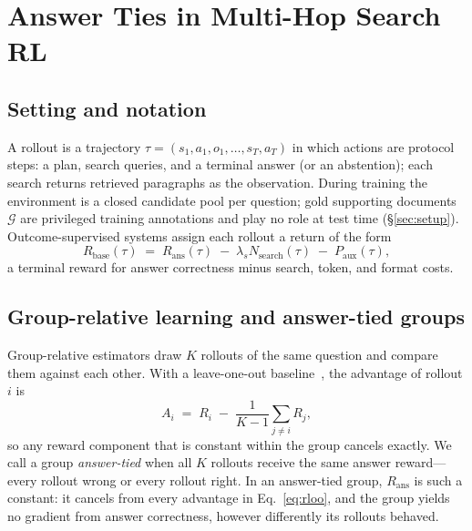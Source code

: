 
\section{Answer Ties in Multi-Hop Search RL}
\label{sec:starvation}

\subsection{Setting and notation}
\label{sec:starve-setting}

A rollout is a trajectory
$\tau=(s_1,a_1,o_1,\ldots,s_T,a_T)$ in which actions are protocol steps:
a plan, search queries, and a terminal answer (or an abstention); each
search returns retrieved paragraphs as the observation. During training
the environment is a closed candidate pool per question; gold supporting
documents $\mathcal{G}$ are privileged training annotations and play no
role at test time (\S\ref{sec:setup}). Outcome-supervised systems assign
each rollout a return of the form
\begin{equation}
R_{\mathrm{base}}(\tau) \;=\; R_{\mathrm{ans}}(\tau)
\;-\; \lambda_{s} N_{\mathrm{search}}(\tau) \;-\; P_{\mathrm{aux}}(\tau),
\label{eq:base-reward}
\end{equation}
a terminal reward for answer correctness minus search, token, and
format costs.

\subsection{Group-relative learning and answer-tied groups}
\label{sec:starve-ties}

Group-relative estimators draw $K$ rollouts of the same question and
compare them against each other. With a leave-one-out
baseline~\citep{kool2019buy,ahmadian2024rloo}, the advantage of rollout
$i$ is
\begin{equation}
A_i \;=\; R_i \;-\; \frac{1}{K-1}\sum_{j\neq i} R_j ,
\label{eq:rloo}
\end{equation}
so any reward component that is constant within the group cancels
exactly. We call a group \emph{answer-tied} when all $K$ rollouts
receive the same answer reward---every rollout wrong or every rollout
right. In an answer-tied group, $R_{\mathrm{ans}}$ is such a constant:
it cancels from every advantage in Eq.~\ref{eq:rloo}, and the group
yields no gradient from answer correctness, however differently its
rollouts behaved.

